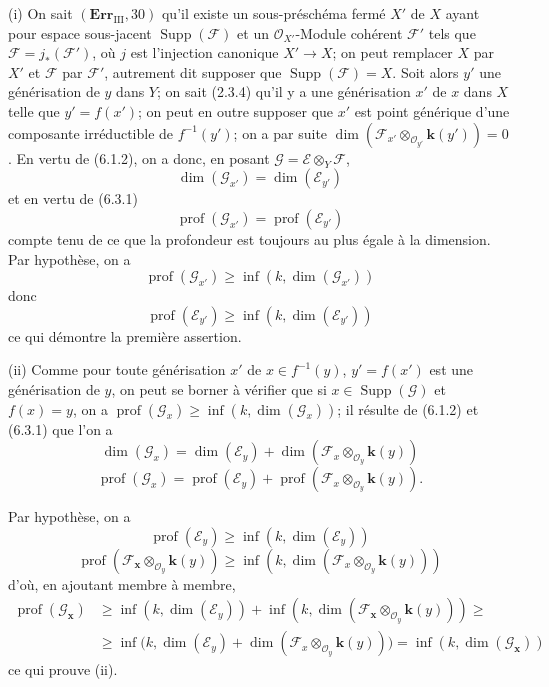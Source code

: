 (i) On sait $(\mathbf{Err}_{\mathrm{III}},30)$ qu'il existe un sous-préschéma
fermé $X'$ de $X$ ayant pour espace sous-jacent
$\operatorname{Supp}(\mathscr F)$ et un $\mathcal O_{X'}$-Module cohérent
$\mathscr F'$ tels que $\mathscr F=j_*(\mathscr F')$, où $j$ est l'injection
canonique $X'\to X$; on peut remplacer $X$ par $X'$ et $\mathscr F$ par
$\mathscr F'$, autrement dit supposer que
$\operatorname{Supp}(\mathscr F)=X$. Soit alors $y'$ une générisation de $y$
dans $Y$; on sait (2.3.4) qu'il y a une générisation $x'$ de $x$ dans $X$
telle que $y'=f(x')$; on peut en outre supposer que $x'$ est point générique
d'une composante irréductible de $f^{-1}(y')$; on a par suite
$\dim(\mathscr F_{x'}\otimes_{\mathcal O_{y'}}\boldsymbol{k}(y'))=0$. En vertu de (6.1.2),
on a donc, en posant $\mathscr G=\mathscr E\otimes_Y\mathscr F$,
\[
\dim(\mathscr G_{x'})=\dim(\mathscr E_{y'})
\]
et en vertu de (6.3.1)
\[
\operatorname{prof}(\mathscr G_{x'})=\operatorname{prof}(\mathscr E_{y'})
\]
compte tenu de ce que la profondeur est toujours au plus égale à la
dimension. Par hypothèse, on a
\[
\operatorname{prof}(\mathscr G_{x'})
\geq\inf(k,\dim(\mathscr G_{x'}))
\]
donc
\[
\operatorname{prof}(\mathscr E_{y'})
\geq\inf(k,\dim(\mathscr E_{y'}))
\]
ce qui démontre la première assertion.


(ii) Comme pour toute générisation $x'$ de $x\in f^{-1}(y)$,
$y'=f(x')$ est une générisation de $y$, on peut se borner à vérifier que si
$x\in\operatorname{Supp}(\mathscr G)$ et $f(x)=y$, on a
$\operatorname{prof}(\mathscr G_x)\geq\inf(k,\dim(\mathscr G_x))$; il résulte
de (6.1.2) et (6.3.1) que l'on a
\[
\dim(\mathscr G_x)=\dim(\mathscr E_y)+
\dim(\mathscr F_x\otimes_{\mathcal O_y}\boldsymbol{k}(y))
\]
\[
\operatorname{prof}(\mathscr G_x)=\operatorname{prof}(\mathscr E_y)+
\operatorname{prof}(\mathscr F_x\otimes_{\mathcal O_y}\boldsymbol{k}(y)).
\]

Par hypothèse, on a
\[
\operatorname{prof}(\mathscr E_y)\geq\inf(k,\dim(\mathscr E_y))
\]
\[
\operatorname{prof}(\mathscr F_{\boldsymbol{x}}\otimes_{\mathcal O_y}\boldsymbol{k}(y))
\geq\inf(k,\dim(\mathscr F_x\otimes_{\mathcal O_y}\boldsymbol{k}(y)))
\]
d'où, en ajoutant membre à membre,
\begin{align*}
\operatorname{prof}(\mathscr G_{\boldsymbol{x}})
&\geq\inf(k,\dim(\mathscr E_y))
+\inf(k,\dim(\mathscr F_{\boldsymbol{x}}\otimes_{\mathcal O_y}\boldsymbol{k}(y)))\geq{}\\
&\geq\inf\bigl(k,\dim(\mathscr E_y)
+\dim(\mathscr F_x\otimes_{\mathcal O_y}\boldsymbol{k}(y))\bigr)
=\inf(k,\dim(\mathscr G_{\boldsymbol{x}}))
\end{align*}
ce qui prouve (ii).

